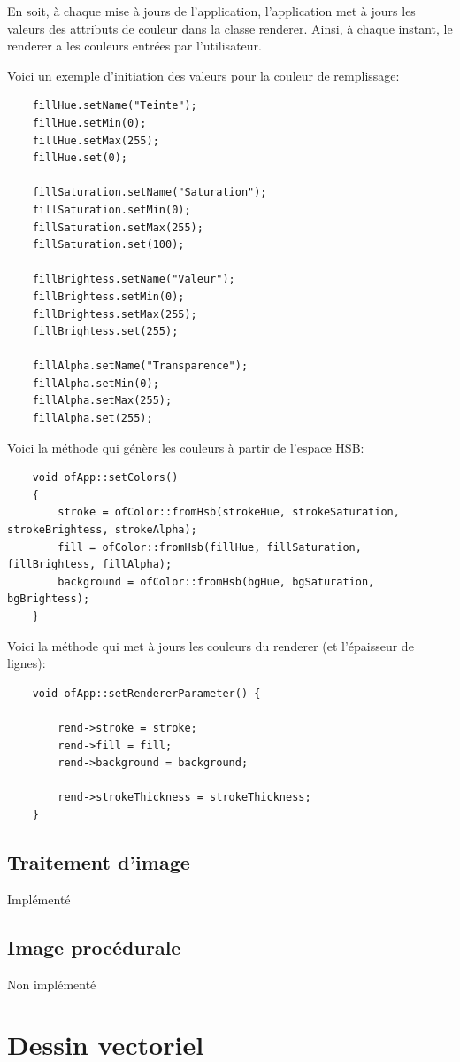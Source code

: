  En soit, à chaque mise à jours de l'application, l'application met à jours les valeurs des attributs de couleur dans la classe renderer. Ainsi, à chaque instant, le renderer a les couleurs entrées par l'utilisateur.
 
 Voici un exemple d'initiation des valeurs pour la couleur de remplissage:
 \begin{lstlisting}
 	fillHue.setName("Teinte");
 	fillHue.setMin(0);
 	fillHue.setMax(255);
 	fillHue.set(0);
 
 	fillSaturation.setName("Saturation");
 	fillSaturation.setMin(0);
 	fillSaturation.setMax(255);
 	fillSaturation.set(100);
 
 	fillBrightess.setName("Valeur");
 	fillBrightess.setMin(0);
	fillBrightess.setMax(255);
	fillBrightess.set(255);
 
 	fillAlpha.setName("Transparence");
 	fillAlpha.setMin(0);
 	fillAlpha.setMax(255);
 	fillAlpha.set(255);
 \end{lstlisting} 

Voici la méthode qui génère les couleurs à partir de l'espace HSB:
\begin{lstlisting}
	void ofApp::setColors()
	{
		stroke = ofColor::fromHsb(strokeHue, strokeSaturation, strokeBrightess, strokeAlpha);
		fill = ofColor::fromHsb(fillHue, fillSaturation, fillBrightess, fillAlpha);
		background = ofColor::fromHsb(bgHue, bgSaturation, bgBrightess);
	}
\end{lstlisting} 

Voici la méthode qui met à jours les couleurs du renderer (et l'épaisseur de lignes):
\begin{lstlisting}
	void ofApp::setRendererParameter() {
		
		rend->stroke = stroke;
		rend->fill = fill;
		rend->background = background;
		
		rend->strokeThickness = strokeThickness;
	}
\end{lstlisting}


\subsection{Traitement d'image}
Implémenté

\subsection{Image procédurale}
Non implémenté

\section{Dessin vectoriel}
